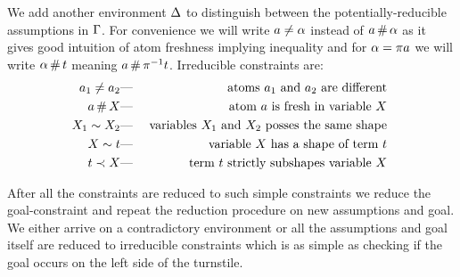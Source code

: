 \documentclass[english, mgr]{iithesis}
\begin{document}
We add another environment $\Delta$ to distinguish between the
potentially-reducible assumptions in $\Gamma$.
For convenience we will write $a \neq \alpha$ instead of $a \,\#\, \alpha$ as it gives
good intuition of atom freshness implying inequality
and for $\alpha = \pi a$ we will write $\alpha \,\#\, t$ meaning
$a \,\#\, \pi^{-1} t$.
Irreducible constraints are:
\begin{eqnarray*}
  a_1 \neq a_2 & \text{---} & \text{
    atoms $a_1$ and $a_2$ are different
  } \\
  a   \,\#\, X   & \text{---} & \text{
    atom $a$ is fresh in variable $X$
  } \\
  X_1 \sim  X_2 & \text{---} & \text{
    variables $X_1$ and $X_2$ posses the same shape
  } \\
  X   \sim  t    & \text{---} & \text{
    variable $X$ has a shape of term $t$
  } \\
  t    \prec  X   & \text{---} & \text{
    term $t$ strictly subshapes variable $X$
  } \\
\end{eqnarray*}

After all the constraints are reduced to such simple constraints
we reduce the goal-constraint and repeat the reduction procedure on
new assumptions and goal. We either arrive on a contradictory environment or
all the assumptions and goal itself are reduced to irreducible constraints which
is as simple as checking if the goal occurs on the left side of the turnstile.
\end{document}
